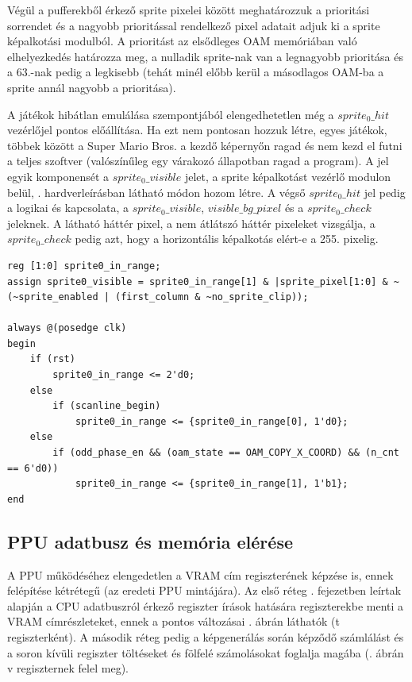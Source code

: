 	Végül a pufferekből érkező sprite pixelei között meghatározzuk a prioritási sorrendet és a nagyobb prioritással rendelkező pixel adatait adjuk ki a sprite képalkotási modulból. A prioritást az elsődleges OAM memóriában való elhelyezkedés határozza meg, a nulladik sprite-nak van a legnagyobb prioritása és a 63.-nak pedig a legkisebb (tehát minél előbb kerül a másodlagos OAM-ba a sprite annál nagyobb a prioritása).
	
	A játékok hibátlan emulálása szempontjából elengedhetetlen még a $sprite_0\_hit$ vezérlőjel pontos előállítása. Ha ezt nem pontosan hozzuk létre, egyes játékok, többek között a Super Mario Bros. a kezdő képernyőn ragad és nem kezd el futni a teljes szoftver (valószínűleg egy várakozó állapotban ragad a program). A jel egyik komponensét a $sprite_0\_visible$ jelet, a sprite képalkotást vezérlő modulon belül, . hardverleírásban látható módon hozom létre. A végső $sprite_0\_hit$ jel pedig a logikai és kapcsolata, a $sprite_0\_visible$, $visible\_bg\_pixel$ és a $sprite_0\_check$ jeleknek. A látható háttér pixel, a nem átlátszó háttér pixeleket vizsgálja, a $sprite_0\_check$ pedig azt, hogy a horizontális képalkotás elért-e a 255. pixelig. %

\begin{lstlisting}[caption={A $sprite_0\_visible$ vezérlőjel előállítása}, label={code:sprite0-visible}, style=prettyverilog]
reg [1:0] sprite0_in_range;
assign sprite0_visible = sprite0_in_range[1] & |sprite_pixel[1:0] & ~(~sprite_enabled | (first_column & ~no_sprite_clip)); 

always @(posedge clk) 
begin
	if (rst)
		sprite0_in_range <= 2'd0;
	else
		if (scanline_begin)
			sprite0_in_range <= {sprite0_in_range[0], 1'd0};
	else
		if (odd_phase_en && (oam_state == OAM_COPY_X_COORD) && (n_cnt == 6'd0))
			sprite0_in_range <= {sprite0_in_range[1], 1'b1};
end\end{lstlisting} 

	\subsection{PPU adatbusz és memória elérése}
	
	A PPU működéséhez elengedetlen a VRAM cím regiszterének képzése is, ennek felépítése kétrétegű (az eredeti PPU mintájára). Az első réteg . fejezetben leírtak alapján a CPU adatbuszról érkező regiszter írások hatására regiszterekbe menti a VRAM címrészleteket, ennek a pontos változásai . ábrán láthatók (t regiszterként). A második réteg pedig a képgenerálás során képződő számlálást és a soron kívüli regiszter töltéseket és fölfelé számolásokat foglalja magába (. ábrán v regiszternek felel meg).
	
